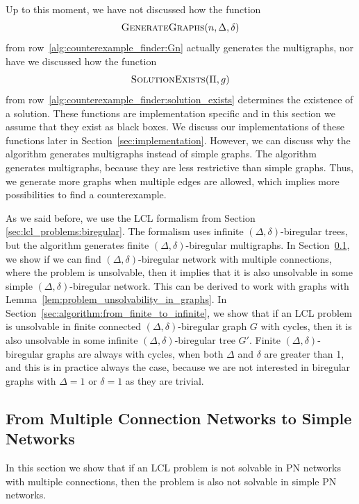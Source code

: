 Up to this moment, we have not discussed how the function \[ \textsc{GenerateGraphs}(n, \Delta, \delta) \] from row~\ref{alg:counterexample_finder:Gn} actually generates the multigraphs, nor have we discussed how the function \[ \textsc{SolutionExists}(\Pi, g) \] from row~\ref{alg:counterexample_finder:solution_exists} determines the existence of a solution.
These functions are implementation specific and in this section we assume that they exist as black boxes.
We discuss our implementations of these functions later in Section~\ref{sec:implementation}.
However, we can discuss why the algorithm generates multigraphs instead of simple graphs.
The algorithm generates multigraphs, because they are less restrictive than simple graphs.
Thus, we generate more graphs when multiple edges are allowed, which implies more possibilities to find a counterexample.

As we said before, we use the LCL formalism from Section \ref{sec:lcl_problems:biregular}.
The formalism uses infinite $(\Delta, \delta)$-biregular trees, but the algorithm generates finite $(\Delta, \delta)$-biregular multigraphs.
In Section~\ref{sec:algorithm:from_multiple_to_simple}, we show if we can find $(\Delta, \delta)$-biregular network with multiple connections, where the problem is unsolvable, then it implies that it is also unsolvable in some simple $(\Delta, \delta)$-biregular network.
This can be derived to work with graphs with Lemma~\ref{lem:problem_unsolvability_in_graphs}.
In Section~\ref{sec:algorithm:from_finite_to_infinite}, we show that if an LCL problem is unsolvable in finite connected $(\Delta, \delta)$-biregular graph $G$ with cycles, then it is also unsolvable in some infinite $(\Delta, \delta)$-biregular tree $G'$.
Finite $(\Delta, \delta)$-biregular graphs are always with cycles, when both $\Delta$ and $\delta$ are greater than 1, and this is in practice always the case, because we are not interested in biregular graphs with $\Delta=1$ or $\delta=1$ as they are trivial.


\subsection{From Multiple Connection Networks to Simple Networks} \label{sec:algorithm:from_multiple_to_simple}

In this section we show that if an LCL problem is not solvable in PN networks with multiple connections, then the problem is also not solvable in simple PN networks.

